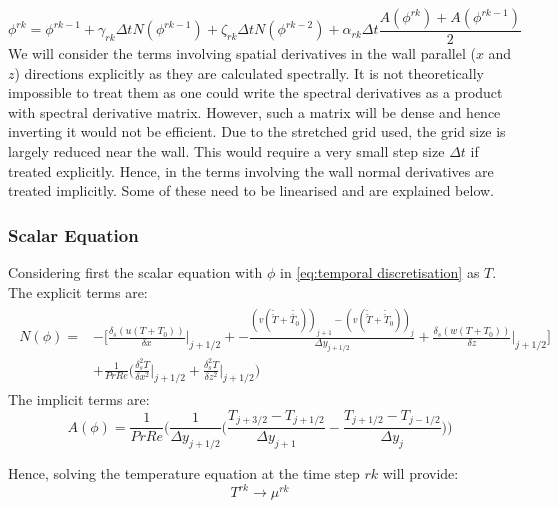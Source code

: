 \documentclass[preprint,12pt]{article}
\begin{document}
\begin{equation}
\phi^{rk}=\phi^{rk-1}+\gamma_{rk}\Delta t N(\phi^{rk-1})+\zeta_{rk}\Delta t N(\phi^{rk-2})+\alpha_{rk}\Delta t\frac{A(\phi^{rk})+A(\phi^{rk-1})}{2}
\end{equation}
We will consider the terms involving spatial derivatives in the wall parallel ($x$ and $z$) directions explicitly as they are calculated spectrally. It is not theoretically impossible to treat them as one could write the spectral derivatives as a product with spectral derivative matrix. However, such a matrix will be dense and hence inverting it would not be efficient. Due to the stretched grid used, the grid size is largely reduced near the wall. This would require a very small step size $\Delta t$ if treated explicitly. Hence, in the terms involving the wall normal derivatives are treated implicitly. Some of these need to be linearised and are explained below.
\subsubsection{Scalar Equation}
Considering first the scalar equation with $\phi$ in \eqref{eq:temporal discretisation} as $T$.
The explicit terms are:
\begin{align}\label{eq:implicit_Temperature_1}
\begin{split}
N(\phi)=&-\Bigg[\frac{ \delta_s(u(T+T_0))}{\delta x}\Big|_{j+1/2}+-\frac{(v(\check{\check{T}}+\check{\check{T_0}}))_{j+1}-(v(\check{\check{T}}+\check{\check{T}}_0))_{j}}{\Delta y_{j+1/2}}+\frac{ \delta_s(w(T+T_0))}{\delta z}\Big|_{j+1/2} \Bigg]\\&+\frac{1}{PrRe}\Bigg(\frac{\delta_s^2T}{\delta x^2}\Bigg|_{j+1/2} +\frac{\delta_s^2T}{\delta z^2}\Bigg|_{j+1/2}\Bigg)
\end{split}\end{align}
The implicit terms are:
\begin{equation}\label{eq:explicit_Temperature_1}
A(\phi)=\frac{1}{PrRe}\Bigg(\frac{1}{\Delta y_{j+1/2}}\Big(\frac{T_{j+3/2}-T_{j+1/2}}{\Delta y_{j+1}}-\frac{T_{j+1/2}-T_{j-1/2}}{\Delta y_{j}}\Big)\Bigg)
\end{equation}

Hence, solving the temperature equation at the time step $rk$ will provide:
\begin{equation}
T^{rk}\rightarrow\mu^{rk}
\end{equation} 
\end{document}
